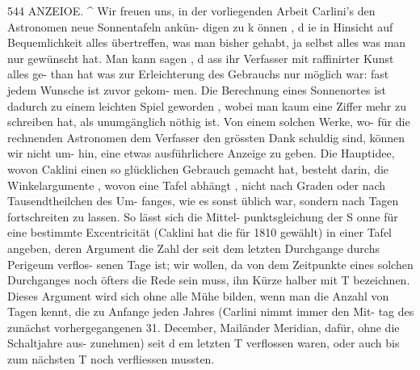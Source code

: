 \documentclass[12pt,a4paper]{article}
\begin{document}
\newpage
544 ANZEIOE. \^{}\newline
Wir freuen uns, in der vorliegenden Arbeit Carlini's den Astronomen neue Sonnentafeln ankün-\newline
digen zu k önnen , d ie in Hinsicht auf Bequemlichkeit alles übertreffen, was man bisher gehabt, ja selbst\newline
alles was man nur gewünscht hat. Man kann sagen , d ass ihr Verfasser mit raffinirter Kunst alles ge-\newline
than hat was zur Erleichterung des Gebrauchs nur möglich war: fast jedem Wunsche ist zuvor gekom-\newline
men. Die Berechnung eines Sonnenortes ist dadurch zu einem leichten Spiel geworden , wobei man\newline
kaum eine Ziffer mehr zu schreiben hat, als unumgänglich nöthig ist. Von einem solchen Werke, wo-\newline
für die rechnenden Astronomen dem Verfasser den grössten Dank schuldig sind, können wir nicht um-\newline
hin, eine etwas ausführlichere Anzeige zu geben.\newline
Die Hauptidee, wovon Caklini einen so glücklichen Gebrauch gemacht hat, besteht darin, die\newline
Winkelargumente , wovon eine Tafel abhängt , nicht nach Graden oder nach Tausendtheilchen des Um-\newline
fanges, wie es sonst üblich war, sondern nach Tagen fortschreiten zu lassen. So lässt sich die Mittel-\newline
punktsgleichung der S onne für eine bestimmte Excentricität (Caklini hat die für 1810 gewählt) in einer\newline
Tafel angeben, deren Argument die Zahl der seit dem letzten Durchgange durchs Perigeum verflos-\newline
senen Tage ist; wir wollen, da von dem Zeitpunkte eines solchen Durchganges noch öfters die Rede\newline
sein muss, ihn Kürze halber mit T bezeichnen. Dieses Argument wird sich ohne alle Mühe bilden,\newline
wenn man die Anzahl von Tagen kennt, die zu Anfange jeden Jahres (Carlini nimmt immer den Mit-\newline
tag des zunächst vorhergegangenen 31. December, Mailänder Meridian, dafür, ohne die Schaltjahre aus-\newline
zunehmen) seit d em letzten T verflossen waren, oder auch bis zum nächsten T noch verfliessen mussten.\newline
\end{document}
